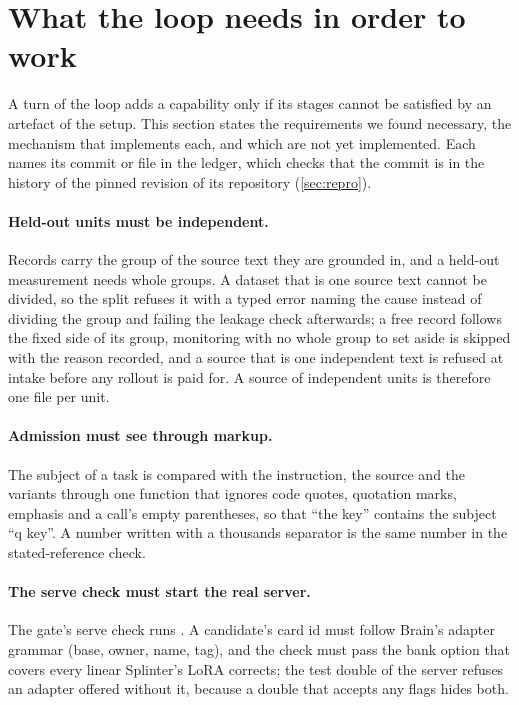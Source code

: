 
\section{What the loop needs in order to work}\label{sec:requirements}

A turn of the loop adds a capability only if its stages cannot be satisfied by an artefact of
the setup. This section states the requirements we found necessary, the mechanism that
implements each, and which are not yet implemented. Each names its commit or file in the
ledger, which checks that the commit is in the history of the pinned revision of its
repository (\cref{sec:repro}).

\paragraph{Held-out units must be independent.} Records carry the group of the source text they
are grounded in, and a held-out measurement needs whole groups. A dataset that is one source
text cannot be divided, so the split refuses it with a typed error naming the cause instead of
dividing the group and failing the leakage check afterwards; a free record follows the fixed
side of its group, monitoring with no whole group to set aside is skipped with the reason
recorded, and a source that is one independent text is refused at intake before any rollout is
paid for. A source of independent units is therefore one file per unit.

\paragraph{Admission must see through markup.} The subject of a task is compared with the
instruction, the source and the variants through one function that ignores code quotes,
quotation marks, emphasis and a call's empty parentheses, so that ``the  key'' contains
the subject ``q key''. A number written with a thousands separator is the same number
in the stated-reference check.

\paragraph{The serve check must start the real server.} The gate's serve check runs
. A candidate's card id must follow Brain's adapter grammar
(base, owner, name, tag), and the check must pass the bank option that covers every linear
Splinter's LoRA corrects; the test double of the server refuses an adapter offered without it,
because a double that accepts any flags hides both.

